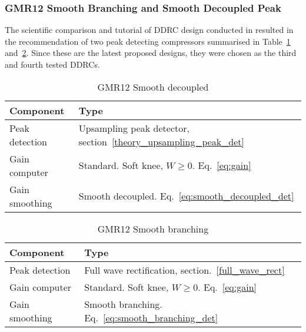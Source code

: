 \documentclass[../main2.tex]{subfiles}
\begin{document}
\subsubsection{GMR12 Smooth Branching and Smooth Decoupled Peak}
The scientific comparison and tutorial of DDRC design conducted in \cite{reiss2012tutorial} resulted in the recommendation of two peak detecting compressors summarised in Table~\ref{tab:gmr12_decoupled} and~\ref{tab:gmr12_branching}. Since these are the latest proposed designs, they were chosen as the third and fourth tested DDRCs.
\begin{table}[h]
\begin{center}
\caption{GMR12 Smooth decoupled}
\label{tab:gmr12_decoupled}
\begin{tabular}{| l | l |}
	\hline
	Component & Type \\ \hline
	Peak detection & Upsampling peak detector, section~\ref{theory_upsampling_peak_det} \\
	Gain computer & Standard. Soft knee, $W\geq0$. Eq.~\eqref{eq:gain} \\
	Gain smoothing & Smooth decoupled. Eq.~\eqref{eq:smooth_decoupled_det} \\
	\hline
\end{tabular}
\end{center}
\end{table}
\begin{table}[h]
\begin{center}
\caption{GMR12 Smooth branching}
\label{tab:gmr12_branching}
\begin{tabular}{| l | l |}
	\hline
	Component & Type \\ \hline
	Peak detection & Full wave rectification, section.~\ref{full_wave_rect} \\
	Gain computer & Standard. Soft knee, $W\geq0$. Eq.~\eqref{eq:gain} \\
	Gain smoothing & Smooth branching. Eq.~\eqref{eq:smooth_branching_det} \\
	\hline
\end{tabular}
\end{center}
\end{table}
\end{document}
